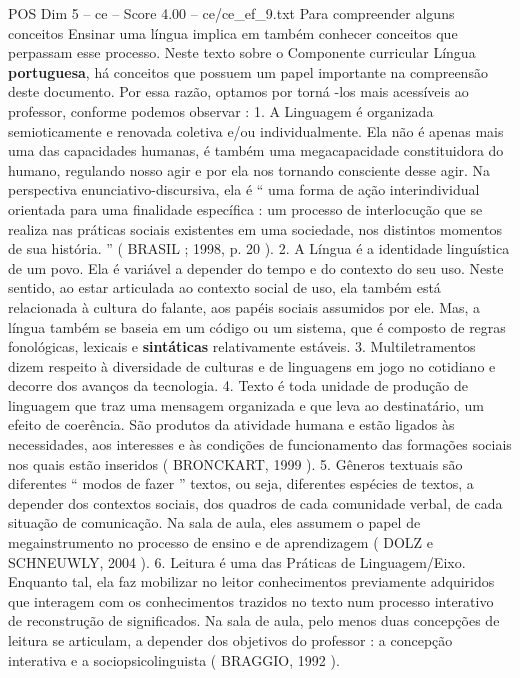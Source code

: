 \begin{textsample}{POS Dim 5 – ce – Score 4.00 – ce/ce\_ef\_9.txt}  \label{ex:f5_pos_260}
Para compreender alguns conceitos Ensinar uma língua implica em também conhecer conceitos que perpassam esse processo.
Neste texto sobre o Componente curricular Língua \textbf{portuguesa}, há conceitos que possuem um papel importante na compreensão deste documento.
Por essa razão, optamos por torná -los mais acessíveis ao professor, conforme podemos observar : 1.
A Linguagem é organizada semioticamente e renovada coletiva e/ou individualmente.
Ela não é apenas mais uma das capacidades humanas, é também uma megacapacidade constituidora do humano, regulando nosso agir e por ela nos tornando consciente desse agir.
Na perspectiva enunciativo-discursiva, ela é “ uma forma de ação interindividual orientada para uma finalidade específica : um processo de interlocução que se realiza nas práticas sociais existentes em uma sociedade, nos distintos momentos de sua história. ” ( BRASIL ; 1998, p. 20 ). 2.
A Língua é a identidade linguística de um povo.
Ela é variável a depender do tempo e do contexto do seu uso.
Neste sentido, ao estar articulada ao contexto social de uso, ela também está relacionada à cultura do falante, aos papéis sociais assumidos por ele.
Mas, a língua também se baseia em um código ou um sistema, que é composto de regras fonológicas, lexicais e \textbf{sintáticas} relativamente estáveis. 3.
Multiletramentos dizem respeito à diversidade de culturas e de linguagens em jogo no cotidiano e decorre dos avanços da tecnologia. 4.
Texto é toda unidade de produção de linguagem que traz uma mensagem organizada e que leva ao destinatário, um efeito de coerência.
São produtos da atividade humana e estão ligados às necessidades, aos interesses e às condições de funcionamento das formações sociais nos quais estão inseridos ( BRONCKART, 1999 ). 5.
Gêneros textuais são diferentes “ modos de fazer ” textos, ou seja, diferentes espécies de textos, a depender dos contextos sociais, dos quadros de cada comunidade verbal, de cada situação de comunicação.
Na sala de aula, eles assumem o papel de megainstrumento no processo de ensino e de aprendizagem ( DOLZ e SCHNEUWLY, 2004 ). 6.
Leitura é uma das Práticas de Linguagem/Eixo.
Enquanto tal, ela faz mobilizar no leitor conhecimentos previamente adquiridos que interagem com os conhecimentos trazidos no texto num processo interativo de reconstrução de significados.
Na sala de aula, pelo menos duas concepções de leitura se articulam, a depender dos objetivos do professor : a concepção interativa e a sociopsicolinguista ( BRAGGIO, 1992 ).

\end{textsample}

